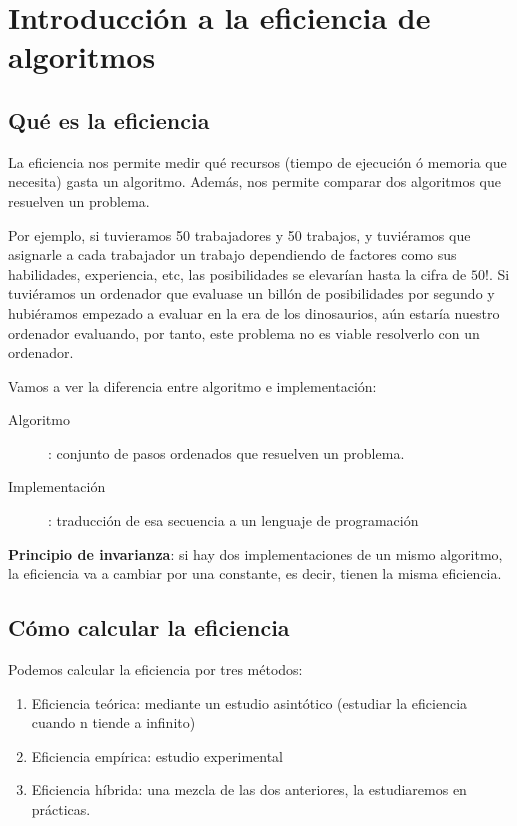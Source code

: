 \documentclass[10pt,a4paper,spanish]{report}
\begin{document}
\chapter{\textcolor[rgb]{0.1,0.2,0.6}{Introducción a la eficiencia de algoritmos}}
\section{\textcolor[rgb]{0.1,0.2,0.6}Qué es la eficiencia}
\noindent
La eficiencia nos permite medir qué recursos (tiempo de ejecución ó memoria que necesita) gasta un algoritmo. Además, nos permite comparar dos algoritmos que resuelven un problema.

\noindent
Por ejemplo, si tuvieramos 50 trabajadores y 50 trabajos, y tuviéramos que asignarle a cada trabajador un trabajo dependiendo de factores como sus habilidades, experiencia, etc, las posibilidades se elevarían hasta la cifra de $50!$. Si tuviéramos un ordenador que evaluase un billón de posibilidades por segundo y hubiéramos empezado a evaluar en la era de los dinosaurios, aún estaría nuestro ordenador evaluando, por tanto, este problema no es viable resolverlo con un ordenador.

\noindent
Vamos a ver la diferencia entre algoritmo e implementación:
\begin{description}
\item[Algoritmo]: conjunto de pasos ordenados que resuelven un problema.
\item[Implementación]: traducción de esa secuencia a un lenguaje de programación
\end{description}

\noindent
\textbf{Principio de invarianza}: si hay dos implementaciones de un mismo algoritmo, la eficiencia va a cambiar por una constante, es decir, tienen la misma eficiencia.

\section{\textcolor[rgb]{0.1,0.2,0.6}Cómo calcular la eficiencia}
\noindent
Podemos calcular la eficiencia por tres métodos:
\begin{enumerate}[---]
\item Eficiencia teórica: mediante un estudio asintótico (estudiar la eficiencia cuando  n tiende a infinito)
\item Eficiencia empírica: estudio experimental
\item Eficiencia híbrida: una mezcla de las dos anteriores, la estudiaremos en prácticas.
\end{enumerate}
\end{document}
